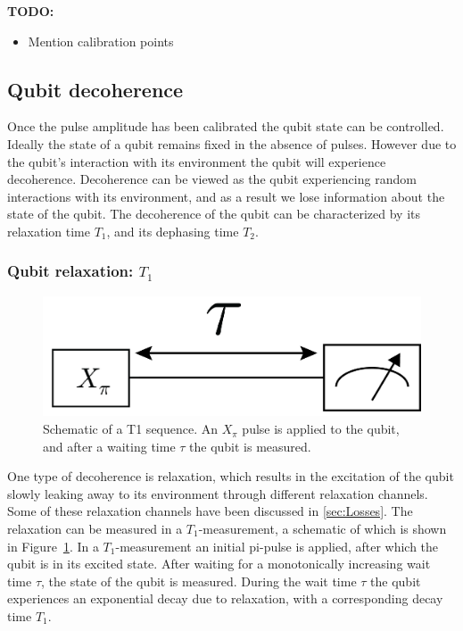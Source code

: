         \textbf{TODO:}
        \begin{itemize}
          \item Mention calibration points
        \end{itemize}

      \subsection{Qubit decoherence}
        Once the pulse amplitude has been calibrated the qubit state can be controlled. Ideally the state of a qubit remains fixed in the absence of pulses. However due to the qubit's interaction with its environment the qubit will experience decoherence. Decoherence can be viewed as the qubit experiencing random interactions with its environment, and as a result we lose information about the state of the qubit. The decoherence of the qubit can be characterized by its relaxation time $T_1$, and its dephasing time $T_2$.

        \subsubsection{Qubit relaxation: $T_1$}

          \begin{figure}
            \begin{center}
            \vspace{-30pt}
              \includegraphics[width=\textwidth]{../Figures/Qubit characterization/T1 decoherence.png}
            \end{center}
            \vspace{-20 pt}
            \caption{Schematic of a T1 sequence. An $X_\pi$ pulse is applied to the qubit, and after a waiting time $\tau$ the qubit is measured.}
            \label{fig:T1 schematic}
          \end{figure}

          One type of decoherence is relaxation, which results in the excitation of the qubit slowly leaking away to its environment through different relaxation channels. Some of these relaxation channels have been discussed in \ref{sec:Losses}. The relaxation can be measured in a $T_1$-measurement, a schematic of which is shown in Figure~\ref{fig:T1 schematic}. In a $T_1$-measurement an initial pi-pulse is applied, after which the qubit is in its excited state. After waiting for a monotonically increasing wait time $\tau$, the state of the qubit is measured. During the wait time $\tau$ the qubit experiences an exponential decay due to relaxation, with a corresponding decay time $T_1$.

